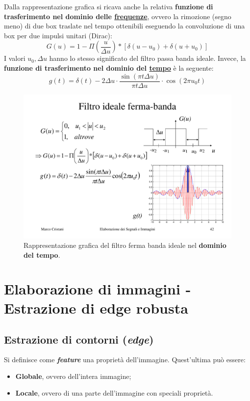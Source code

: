 \documentclass[a4paper]{article}
\begin{document}
	\noindent
	Dalla rappresentazione grafica si ricava anche la relativa \textbf{funzione di trasferimento nel dominio delle \underline{frequenze}}, ovvero la rimozione (segno meno) di due box traslate nel tempo ottenibili eseguendo la convoluzione di una box per due impulsi unitari (Dirac):
	\begin{equation*}
		G\left(u\right) = 1 - \Pi\left(\dfrac{u}{\Delta u}\right) * \left[\delta\left(u-u_{0}\right) + \delta\left(u+u_{0}\right)\right]
	\end{equation*}
	I valori $u_{0}, \Delta u$ hanno lo stesso significato del filtro passa banda ideale. Invece, la \textbf{funzione di trasferimento nel dominio del \underline{tempo}} è la seguente:
	\begin{equation*}
		g\left(t\right) = \delta\left(t\right) - 2\Delta u \cdot \dfrac{\sin\left(\pi t \Delta u\right)}{\pi t \Delta u} \cdot \cos\left(2 \pi u_{0} t\right)
	\end{equation*}
	\begin{figure}[!htp]
		\centering
		\includegraphics[width=.5\textwidth]{img/filtro_ferma_banda_ideale_grafico_tempo.pdf}
		\caption{Rappresentazione grafica del filtro ferma banda ideale nel \textbf{dominio del tempo}.}
	\end{figure}\newpage
	
	\section{Elaborazione di immagini - Estrazione di edge robusta}
	
	\subsection{Estrazione di contorni (\emph{edge})}
	
	Si definisce come \textbf{\emph{feature}} una proprietà dell'immagine. Quest'ultima può essere:
	\begin{itemize}
		\item \textbf{Globale}, ovvero dell'intera immagine;
		\item \textbf{Locale}, ovvero di una parte dell'immagine con speciali proprietà.
	\end{itemize}
	
\end{document}
